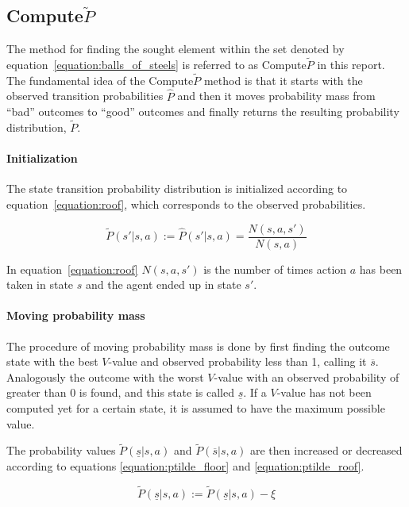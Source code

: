\subsection{Compute$\tilde{P}$}
\label{sec:ptilde}

The method for finding the sought element within the set denoted by
equation~\eqref{equation:balls_of_steels} is referred to as Compute$\tilde{P}$ in this
report.  The fundamental idea of the Compute$\tilde{P}$ method is that it
starts with the observed transition probabilities $\hat{P}$ and then it moves
probability mass from ``bad'' outcomes to ``good'' outcomes and finally returns
the resulting probability distribution, $\tilde{P}$. 


\paragraph{Initialization} The state transition probability distribution is
initialized according to equation~\eqref{equation:roof}, which corresponds to
the observed probabilities.

\begin{equation}
\label{equation:roof}
\tilde{P}(s'|s, a) := \hat{P}(s'|s, a) = \frac{N(s,a,s')}{N(s,a)}
\end{equation}

In equation~\eqref{equation:roof} $N(s, a, s')$ is the number of times action
$a$ has been taken in state $s$ and the agent ended up in state $s'$.

\paragraph{Moving probability mass}

The procedure of moving probability mass is done by first finding the outcome
state with the best $V$-value and observed probability less than 1, calling it
$\overline{s}$. Analogously the outcome with the worst $V$-value with an
observed probability of greater than 0 is found, and this state is called
$\underline{s}$. If a $V$-value has not been computed yet for a certain state,
it is assumed to have the maximum possible value. 

The probability values $\tilde{P}(\underline{s}|s,a)$ and
$\tilde{P}(\overline{s}|s,a)$ are then increased or decreased according to
equations \eqref{equation:ptilde_floor} and \eqref{equation:ptilde_roof}.

\begin{equation}
\label{equation:ptilde_floor}
\tilde{P}(\underline{s}|s,a) := \tilde{P}(\underline{s}|s,a)-\xi
\end{equation}

